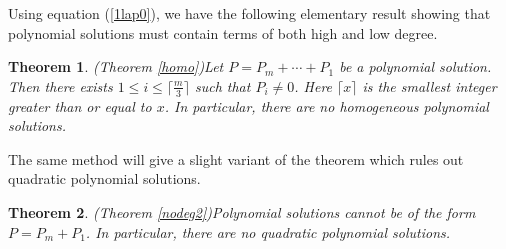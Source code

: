 \documentclass[pdflatex,sn-mathphys-num]{sn-jnl}%
\theoremstyle{thmstyleone}%
\newtheorem{theorem}{Theorem}[section]%
\theoremstyle{thmstyletwo}%
\theoremstyle{thmstylethree}%
\begin{document}
Using equation (\ref{1lap0}), we have the following elementary result showing that polynomial solutions must contain terms of both high and low degree.

\begin{theorem}(Theorem \ref{homo})\label{homo0}
	Let $P=P_m+\cdots+P_1$ be a polynomial solution. Then there exists $1\le i\le \lceil\frac{m}{3}\rceil$ such that $P_i\neq0$. Here $\lceil x\rceil$ is the smallest integer greater than or equal to $x$. In particular, there are no homogeneous polynomial solutions.
\end{theorem}


The same method will give a slight variant of the theorem which rules out quadratic polynomial solutions.
\begin{theorem}(Theorem \ref{nodeg2})\label{nodeg20}
	Polynomial solutions cannot be of the form $P=P_m+P_1$. In particular, there are no quadratic polynomial solutions.
\end{theorem}
\end{document}
